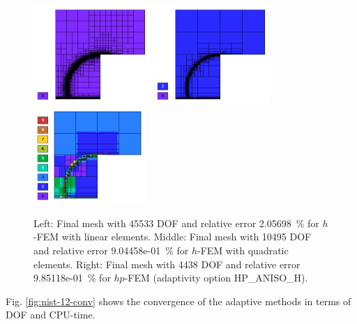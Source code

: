 \documentclass[12pt]{elsarticle}
\begin{document}
\begin{figure}[H]
\centering
\vspace{-3mm}
\includegraphics[height=3.7cm]{nist/nist-12/mesh_h1_aniso.png}
\includegraphics[height=3.7cm]{nist/nist-12/mesh_h2_aniso.png}
\includegraphics[height=3.7cm]{nist/nist-12/mesh_hp_aniso.png}
\vspace{-3mm}
\caption{
Left: Final mesh with 45533 DOF and relative error 2.05698~\% for $h$-FEM with linear elements.
Middle: Final mesh with 10495 DOF and relative error 9.04458e-01~\% for $h$-FEM with quadratic elements. 
Right: Final mesh with 4438 DOF and relative error 9.85118e-01~\% for $hp$-FEM (adaptivity option HP\_ANISO\_H).}
\vspace{-3mm}
\label{fig:nist-12-hp-aniso}
\end{figure}

Fig. \ref{fig:nist-12-conv} shows the convergence of the adaptive methods in terms of DOF and CPU-time.
\end{document}
